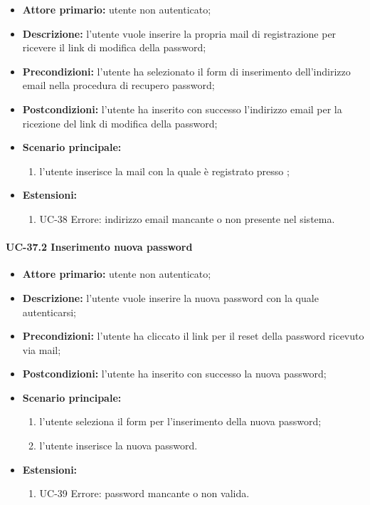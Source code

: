 	\begin{itemize}
		\item \textbf{Attore primario:} utente non autenticato;

		\item \textbf{Descrizione:} l'utente vuole inserire la propria mail di registrazione per ricevere il link di modifica della password;

		\item \textbf{Precondizioni:} l'utente ha selezionato il form di inserimento dell'indirizzo email nella procedura di recupero password;

		\item \textbf{Postcondizioni:} l'utente ha inserito con successo l'indirizzo email per la ricezione del link di modifica della password;

		\item \textbf{Scenario principale:}
	  		\begin{enumerate}
		  		\item l'utente inserisce la mail con la quale è registrato presso ; 
	  		\end{enumerate}
	  	\item \textbf{Estensioni:}
	  		\begin{enumerate}
		  		\item UC-38 Errore: indirizzo email mancante o non presente nel sistema.
	  		\end{enumerate}
		\end{itemize}

\paragraph{UC-37.2 Inserimento nuova password}

	\begin{itemize}
		\item \textbf{Attore primario:} utente non autenticato;

		\item \textbf{Descrizione:} l'utente vuole inserire la nuova password con la quale autenticarsi;

		\item \textbf{Precondizioni:} l'utente ha cliccato il link per il reset della password ricevuto via mail;

		\item \textbf{Postcondizioni:} l'utente ha inserito con successo la nuova password;

		\item \textbf{Scenario principale:}
	  		\begin{enumerate}
		  		\item l'utente seleziona il form per l'inserimento della nuova password;
		  		\item l'utente inserisce la nuova password.
	  		\end{enumerate}
	  	\item \textbf{Estensioni:}
	  		\begin{enumerate}
		  		\item UC-39 Errore: password mancante o non valida.
	  		\end{enumerate}
	\end{itemize}

